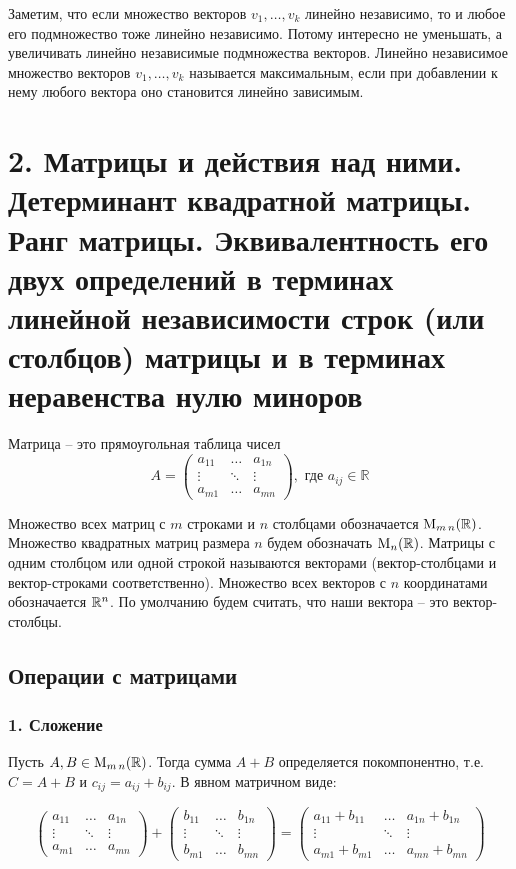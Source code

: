 \documentclass{article}
\begin{document}
Заметим, что если множество векторов $v_1,\ldots, v_k$ линейно независимо, то и любое его подмножество тоже линейно независимо.
Потому интересно не уменьшать, а увеличивать линейно независимые подмножества векторов.
Линейно независимое множество векторов $v_1,\ldots, v_k$ называется максимальным, если при добавлении к нему любого вектора оно становится линейно зависимым.
\pagebreak

\section*{2. Матрицы и действия над ними. Детерминант квадратной матрицы. Ранг матрицы. Эквивалентность его двух определений в терминах линейной независимости строк (или столбцов) матрицы и в терминах неравенства нулю миноров}

Матрица -- это прямоугольная таблица чисел
\begin{equation*}
A=
\begin{pmatrix}
	a_{11} & \ldots & a_{1n} \\
	\vdots & \ddots & \vdots \\
	a_{m1} & \ldots & a_{mn}
\end{pmatrix}, \text{ где } a_{ij} \in \mathbb{R}
\end{equation*}

Множество всех матриц с $m$ строками и $n$ столбцами обозначается $\operatorname{M}_{m\,n}(\mathbb R)$. Множество квадратных матриц размера $n$ будем обозначать $\operatorname{M}_{n}(\mathbb R)$. Матрицы с одним столбцом или одной строкой называются векторами (вектор-столбцами и вектор-строками соответственно). Множество всех векторов с $n$ координатами обозначается $\mathbb R^{n}$. По умолчанию будем считать, что наши вектора -- это вектор-столбцы.

\subsection*{Операции с матрицами}

\subsubsection*{1. Сложение} Пусть $A, B \in \operatorname{M}_{m\,n}(\mathbb R)$. Тогда сумма $A + B$ определяется покомпонентно, т.е. $C = A + B$ и $c_{ij} = a_{ij} + b_{ij}$. В явном матричном виде:

\[
\begin{pmatrix}
	a_{11} & \ldots & a_{1n} \\
	\vdots & \ddots & \vdots \\
	a_{m1} & \ldots & a_{mn}
\end{pmatrix}
+
\begin{pmatrix}
	b_{11} & \ldots & b_{1n} \\
	\vdots & \ddots & \vdots \\
	b_{m1} & \ldots & b_{mn}
\end{pmatrix}
=
\begin{pmatrix}
	a_{11}+b_{11} & \ldots & a_{1n}+b_{1n} \\
	\vdots & \ddots & \vdots \\
	a_{m1}+b_{m1} & \ldots & a_{mn}+b_{mn}
\end{pmatrix}
\]
\end{document}
